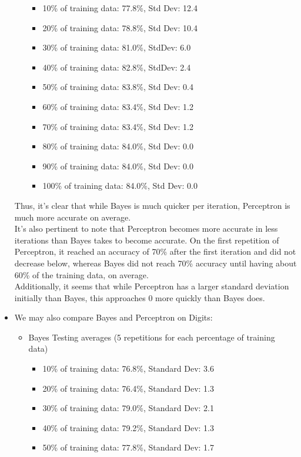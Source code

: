 \documentclass[11pt]{article}
\begin{document}
\begin{itemize}
\begin{itemize}
			\begin{itemize}
				\item 10\% of training data: 77.8\%, Std Dev: 12.4
				\item 20\% of training data: 78.8\%, Std Dev: 10.4
				\item 30\% of training data: 81.0\%, StdDev: 6.0
				\item 40\% of training data: 82.8\%, StdDev: 2.4
				\item 50\% of training data: 83.8\%, Std Dev: 0.4
				\item 60\% of training data: 83.4\%, Std Dev: 1.2
				\item 70\% of training data: 83.4\%, Std Dev: 1.2
				\item 80\% of training data: 84.0\%, Std Dev: 0.0
				\item 90\% of training data: 84.0\%, Std Dev: 0.0
				\item 100\% of training data: 84.0\%, Std Dev: 0.0
			\end{itemize}
		\end{itemize}
		Thus, it's clear that while Bayes is much quicker per iteration, Perceptron is much more accurate on average. 
		\\
		It's also pertinent to note that Perceptron becomes more accurate in less iterations than Bayes takes to become accurate. On the first repetition of Perceptron, it reached an accuracy of 70\% after the first iteration and did not decrease below, whereas Bayes did not reach 70\% accuracy until having about 60\% of the training data, on average.
		\\
		Additionally, it seems that while Perceptron has a larger standard deviation initially than Bayes, this approaches 0 more quickly than Bayes does.
		\item We may also compare Bayes and Perceptron on Digits:
		\begin{itemize}
			\item Bayes Testing averages (5 repetitions for each percentage of training data)
			\begin{itemize}
				\item 10\% of training data: 76.8\%, Standard Dev: 3.6
				\item 20\% of training data: 76.4\%, Standard Dev: 1.3
				\item 30\% of training data: 79.0\%, Standard Dev: 2.1
				\item 40\% of training data: 79.2\%, Standard Dev: 1.3
				\item 50\% of training data: 77.8\%, Standard Dev: 1.7

\end{itemize}
\end{itemize}
\end{itemize}
\end{document}
